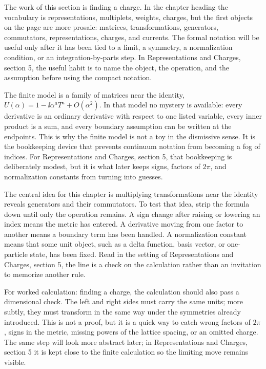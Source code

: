 The work of this section is finding a charge.  In the chapter heading the vocabulary is representations, multiplets, weights, charges, but the first objects on the page are more prosaic: matrices, transformations, generators, commutators, representations, charges, and currents.  The formal notation will be useful only after it has been tied to a limit, a symmetry, a normalization condition, or an integration-by-parts step.  In Representations and Charges, section 5, the useful habit is to name the object, the operation, and the assumption before using the compact notation.

The finite model is a family of matrices near the identity, \(U(\alpha)=1-\ii\alpha^aT^a+O(\alpha^2)\).  In that model no mystery is available: every derivative is an ordinary derivative with respect to one listed variable, every inner product is a sum, and every boundary assumption can be written at the endpoints.  This is why the finite model is not a toy in the dismissive sense.  It is the bookkeeping device that prevents continuum notation from becoming a fog of indices.  For Representations and Charges, section 5, that bookkeeping is deliberately modest, but it is what later keeps signs, factors of \(2\pi\), and normalization constants from turning into guesses.

The central idea for this chapter is multiplying transformations near the identity reveals generators and their commutators.  To test that idea, strip the formula down until only the operation remains.  A sign change after raising or lowering an index means the metric has entered.  A derivative moving from one factor to another means a boundary term has been handled.  A normalization constant means that some unit object, such as a delta function, basis vector, or one-particle state, has been fixed.  Read in the setting of Representations and Charges, section 5, the line is a check on the calculation rather than an invitation to memorize another rule.

For worked calculation: finding a charge, the calculation should also pass a dimensional check.  The left and right sides must carry the same units; more subtly, they must transform in the same way under the symmetries already introduced.  This is not a proof, but it is a quick way to catch wrong factors of \(2\pi\), signs in the metric, missing powers of the lattice spacing, or an omitted charge.  The same step will look more abstract later; in Representations and Charges, section 5 it is kept close to the finite calculation so the limiting move remains visible.


